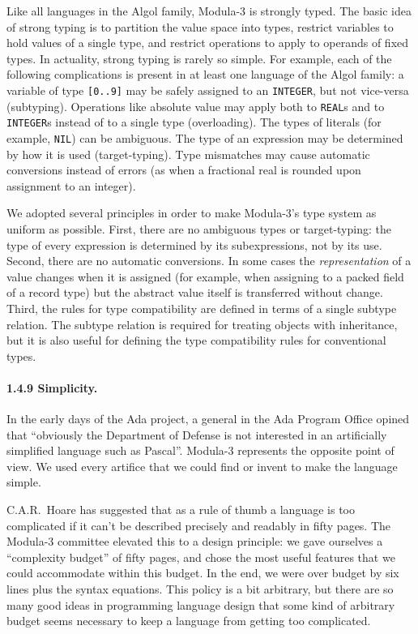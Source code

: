 \documentclass[10pt]{article}
\begin{document}
Like all languages in the Algol family, Modula-3 is strongly typed.  The basic
idea of strong typing is to partition the value space into types, restrict
variables to hold values of a single type, and restrict operations to apply to
operands of fixed types.  In actuality, strong typing is rarely so simple.
For example, each of the following complications is present in at least one
language of the Algol family: a variable of type \verb|[0..9]| may be safely
assigned to an \verb|INTEGER|, but not vice-versa (subtyping).  Operations
like absolute value may apply both to \verb|REAL|s and to \verb|INTEGER|s
instead of to a single type (overloading).  The types of literals (for
example, \verb|NIL|) can be ambiguous.  The type of an expression may be
determined by how it is used (target-typing).  Type mismatches may cause
automatic conversions instead of errors (as when a fractional real is rounded
upon assignment to an integer).

We adopted several principles in order to make Modula-3's type system as
uniform as possible.  First, there are no ambiguous types or target-typing:
the type of every expression is determined by its subexpressions, not by its
use.  Second, there are no automatic conversions.  In some cases the
\emph{representation} of a value changes when it is assigned (for example,
when assigning to a packed field of a record type) but the abstract value
itself is transferred without change.  Third, the rules for type compatibility
are defined in terms of a single subtype relation.  The subtype relation is
required for treating objects with inheritance, but it is also useful for
defining the type compatibility rules for conventional types.

\paragraph{1.4.9 Simplicity.}

In the early days of the Ada project, a general in the Ada Program Office
opined that ``obviously the Department of Defense is not interested in an
artificially simplified language such as Pascal''.  Modula-3 represents the
opposite point of view.  We used every artifice that we could find or invent
to make the language simple.

C.A.R.\ Hoare has suggested that as a rule of thumb a language is too
complicated if it can't be described precisely and readably in fifty pages.
The Modula-3 committee elevated this to a design principle: we gave ourselves
a ``complexity budget'' of fifty pages, and chose the most useful features
that we could accommodate within this budget.  In the end, we were over budget
by six lines plus the syntax equations.  This policy is a bit arbitrary, but
there are so many good ideas in programming language design that some kind of
arbitrary budget seems necessary to keep a language from getting too
complicated.
\end{document}
